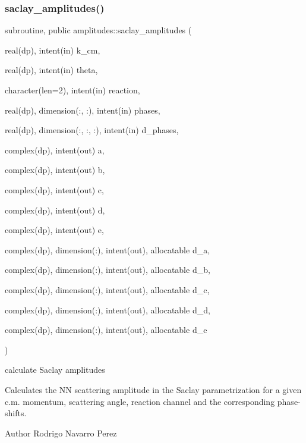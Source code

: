 \subsubsection{\texorpdfstring{saclay\+\_\+amplitudes()}{saclay\_amplitudes()}}
{\footnotesize\ttfamily subroutine, public amplitudes\+::saclay\+\_\+amplitudes (\begin{DoxyParamCaption}\item[{real(dp), intent(in)}]{k\+\_\+cm,  }\item[{real(dp), intent(in)}]{theta,  }\item[{character(len=2), intent(in)}]{reaction,  }\item[{real(dp), dimension(\+:, \+:), intent(in)}]{phases,  }\item[{real(dp), dimension(\+:, \+:, \+:), intent(in)}]{d\+\_\+phases,  }\item[{complex(dp), intent(out)}]{a,  }\item[{complex(dp), intent(out)}]{b,  }\item[{complex(dp), intent(out)}]{c,  }\item[{complex(dp), intent(out)}]{d,  }\item[{complex(dp), intent(out)}]{e,  }\item[{complex(dp), dimension(\+:), intent(out), allocatable}]{d\+\_\+a,  }\item[{complex(dp), dimension(\+:), intent(out), allocatable}]{d\+\_\+b,  }\item[{complex(dp), dimension(\+:), intent(out), allocatable}]{d\+\_\+c,  }\item[{complex(dp), dimension(\+:), intent(out), allocatable}]{d\+\_\+d,  }\item[{complex(dp), dimension(\+:), intent(out), allocatable}]{d\+\_\+e }\end{DoxyParamCaption})}



calculate Saclay amplitudes 

Calculates the NN scattering amplitude in the Saclay parametrization for a given c.\+m. momentum, scattering angle, reaction channel and the corresponding phase-\/shifts.

\begin{DoxyAuthor}{Author}
Rodrigo Navarro Perez
\end{DoxyAuthor}


